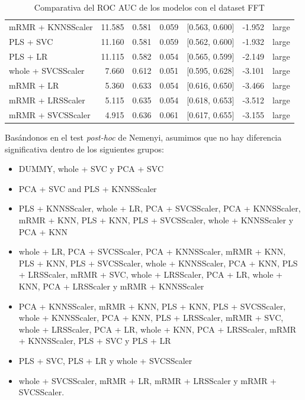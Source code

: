 \documentclass[a4paper,oneside,11pt,leqno]{article}
\begin{document}
\begin{table}[h]
\begin{tabular}{lrrrlll}
			mRMR + KNNSScaler  & 11.585 & 0.581 & 0.059 &  [0.563, 0.600] & -1.952 &       large \\
			PLS + SVC          & 11.160 & 0.581 & 0.059 &  [0.562, 0.600] & -1.932 &       large \\
			PLS + LR           & 11.115 & 0.582 & 0.054 &  [0.565, 0.599] & -2.149 &       large \\
			whole + SVCSScaler &  7.660 & 0.612 & 0.051 &  [0.595, 0.628] & -3.101 &       large \\
			mRMR + LR          &  5.360 & 0.633 & 0.054 &  [0.616, 0.650] & -3.466 &       large \\
			mRMR + LRSScaler   &  5.115 & 0.635 & 0.054 &  [0.618, 0.653] & -3.512 &       large \\
			mRMR + SVCSScaler  &  4.915 & 0.636 & 0.061 &  [0.617, 0.655] & -3.155 &       large \\
			\bottomrule
		\end{tabular}
		\caption{Comparativa del ROC AUC de los modelos con el dataset FFT}
		\label{tab:stat_results_fft}
	\end{table}
	
	Basándonos en el test \textit{post-hoc} de Nemenyi, asumimos que no hay diferencia significativa dentro de los siguientes grupos:
	
	\begin{itemize}
		\item DUMMY, whole + SVC y PCA + SVC
		
		\item PCA + SVC and PLS + KNNSScaler
		
		
		\item  PLS + KNNSScaler, whole + LR, PCA + SVCSScaler, PCA + KNNSScaler, mRMR + KNN, PLS + KNN, PLS + SVCSScaler, whole + KNNSScaler y PCA + KNN
		
		
		\item whole + LR, PCA + SVCSScaler, PCA + KNNSScaler, mRMR + KNN, PLS + KNN, PLS + SVCSScaler, whole + KNNSScaler, PCA + KNN, PLS + LRSScaler, mRMR + SVC, whole + LRSScaler, PCA + LR, whole + KNN, PCA + LRSScaler y mRMR + KNNSScaler
		
		
		\item PCA + KNNSScaler, mRMR + KNN, PLS + KNN, PLS + SVCSScaler, whole + KNNSScaler, PCA + KNN, PLS + LRSScaler, mRMR + SVC, whole + LRSScaler, PCA + LR, whole + KNN, PCA + LRSScaler, mRMR + KNNSScaler, PLS + SVC y PLS + LR
		
		
		\item PLS + SVC, PLS + LR y whole + SVCSScaler
		
		\item whole + SVCSScaler, mRMR + LR, mRMR + LRSScaler y mRMR + SVCSScaler. 
	\end{itemize}
	
\end{document}
